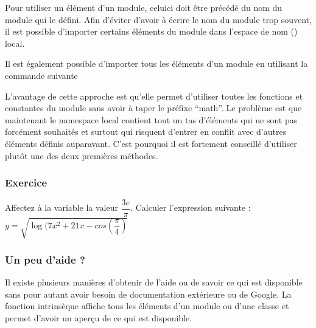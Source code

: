 \documentclass[letterpaper,10pt,english]{sphinxmanual}
\begin{document}
Pour utiliser un élément d’un module, celui\sphinxhyphen{}ci doit être précédé du nom du module qui le défini.
Afin d’éviter d’avoir à écrire le nom du module trop souvent, il est possible d’importer certains éléments du module dans l’espace de nom () local.

\begin{sphinxVerbatim}[commandchars=\\\{\}]
    

\end{sphinxVerbatim}

Il est également possible d’importer tous les éléments d’un module en utilisant la commande suivante

\begin{sphinxVerbatim}[commandchars=\\\{\}]
   

  
\end{sphinxVerbatim}

L’avantage de cette approche est qu’elle permet d’utiliser toutes les fonctions et constantes du module  sans avoir à taper le préfixe “math”.
Le problème est que maintenant le namespace local contient tout un tas d’éléments qui ne sont pas forcément souhaités et surtout qui risquent d’entrer en conflit avec d’autres éléments définis auparavant.
C’est pourquoi il est fortement conseillé d’utiliser plutôt une des deux premières méthodes.


\subsubsection{Exercice}
\label{\detokenize{src/OCI01_Introduction:id4}}
Affectez à la variable  la valeur \(\dfrac{3e}{\pi}\).
Calculer l’expression suivante : \(y=\sqrt{\log(7x^2+21x-cos(\dfrac{\pi}{4})}\)


\subsubsection{Un peu d’aide ?}
\label{\detokenize{src/OCI01_Introduction:un-peu-d-aide}}
Il existe plusieurs manières d’obtenir de l’aide ou de savoir ce qui est disponible sans pour autant avoir besoin de documentation extérieure ou de Google.
La fonction intrinsèque  affiche tous les éléments d’un module ou d’une classe et permet d’avoir un aperçu de ce qui est disponible.
\end{document}

